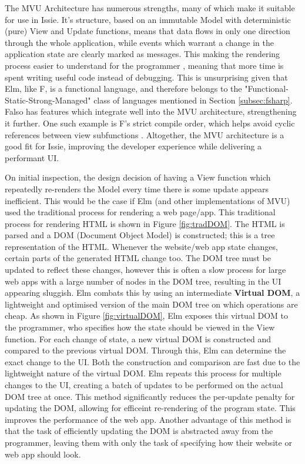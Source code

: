 The MVU Architecture has numerous strengths, many of which make it suitable for use in Issie. It's structure, based on an immutable Model with deterministic (pure) View and Update functions, means that data flows in only one direction through the whole application, while events which warrant a change in the application state are clearly marked as messages. This making the rendering process easier to understand for the programmer \cite{mvuthesis}, meaning that more time is spent writing useful code instead of debugging. This is unsurprising given that Elm, like F\fsharp, is a functional language, and therefore belongs to the "Functional-Static-Strong-Managed" class of languages mentioned in Section \ref{subsec:fsharp}. F\fsharp also has features which integrate well into the MVU architecture, strengthening it further. One such example is F\fsharp's strict compile order, which helps avoid cyclic references between view subfunctions \cite{mvuthesis}. Altogether, the MVU architecture is a good fit for Issie, improving the developer experience while delivering a performant UI.

On initial inspection, the design decision of having a View function which repeatedly re-renders the Model every time there is some update appears inefficient. This would be the case if Elm (and other implementations of MVU) used the traditional process for rendering a web page/app.
This traditional process for rendering HTML is shown in Figure \ref{fig:tradDOM}. The HTML is parsed and a DOM (Document Object Model) is constructed; this is a tree representation of the HTML. Whenever the website/web app state changes, certain parts of the generated HTML change too. The DOM tree must be updated to reflect these changes, however this is often a slow process for large web apps with a large number of nodes in the DOM tree, resulting in the UI appearing sluggish. Elm combats this by using an intermediate \textbf{Virtual DOM}, a lightweight and optimised version of the main DOM tree on which operations are cheap. As shown in Figure \ref{fig:virtualDOM}, Elm exposes this virtual DOM to the programmer, who specifies how the state should be viewed in the View function. For each change of state, a new virtual DOM is constructed and compared to the previous virtual DOM. Through this, Elm can determine the exact change to the UI. Both the construction and comparison are fast due to the lightweight nature of the virtual DOM. Elm repeats this process for multiple changes to the UI, creating a batch of updates to be performed on the actual DOM tree at once. This method significantly reduces the per-update penalty for updating the DOM, allowing for efficeint re-rendering of the program state. This improves the performance of the web app. Another advantage of this method is that the task of efficiently updating the DOM is abstracted away from the programmer, leaving them with only the task of specifying how their website or web app should look.

